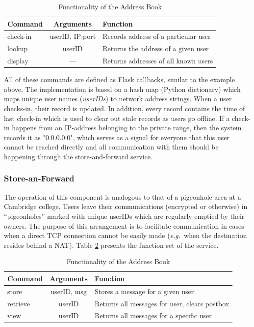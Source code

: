 \documentclass[a4paper, twoside, 12pt]{report}
\begin{document}
\begin{table}[H]
\centering
\begin{tabular*}{0.9\textwidth}{l | c | l}
    Command & Arguments & Function \\
    \hline
    check-in & userID, IP:port& Records address of a particular user \\
    lookup & userID & Returns the address of a given user \\
    display &--- & Returns addresses of all known users \\
\end{tabular*}
\caption{\label{tab:address_book} Functionality of the Address Book}
\end{table}

All of these commands are defined as Flask callbacks, similar to the example above. The implementation is based on a hash map (Python dictionary) which maps unique user names (\emph{userIDs}) to network address strings. When a user checks-in, their record is updated. In addition, every record contains the time of last check-in which is used to clear out stale records as users go offline. If a check-in happens from an IP-address belonging to the private range, then the system records it as "0.0.0.0:0", which serves as a signal for everyone that this user cannot be reached directly and all communication with them should be happening through the store-and-forward service.

\subsubsection{Store-an-Forward}
The operation of this component is analogous to that of a pigeonhole area at a Cambridge college. Users leave their communications (encrypted or otherwise) in ``pigeonholes'' marked with unique userIDs which are regularly emptied by their owners. The purpose of this arrangement is to facilitate communication in cases when a direct TCP connection cannot be easily made (\textit{e.g.}~when the destination resides behind a NAT). Table \ref{tab:saf} presents the function set of the service.

\begin{table}[H]
\centering
\begin{tabular*}{0.9\textwidth}{l | c | l}
    Command & Arguments & Function \\
    \hline
    store & userID, msg & Stores a message for a given user \\
    retrieve & userID & Returns all messages for user, clears postbox\\
    view & userID & Returns all messages for a specific user \\
\end{tabular*}
\caption{\label{tab:saf} Functionality of the Address Book}
\end{table}
\end{document}
